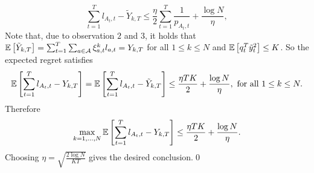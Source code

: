 \documentclass[11pt]{article}
\begin{document}
\begin{equation*}
\sum_{t=1}^Tl_{A_t,t}-\tilde{Y}_{k,T}\leq\frac{\eta}{2}\sum_{t=1}^T\frac{1}{p_{A_t,t}}+\frac{\log N}{\eta},
\end{equation*}
Note that, due to observation $2$ and $3$, it holds that $\mathbb{E}\left[ \tilde{Y}_{k,T} \right]=\sum_{t=1}^T\sum_{a\in \mathcal{A}}\xi_{a,t}^kl_{a,t}=Y_{k,T}$ for all $1\leq k\leq N$ and $\mathbb{E}\left[ q_t^T\tilde{y}_t^2 \right]\leq K$. So the expected regret satisfies
\begin{equation*}
\mathbb{E}\left[ \sum_{t=1}^Tl_{A_t,t}-Y_{k,T} \right]=\mathbb{E}\left[ \sum_{t=1}^Tl_{A_t,t}-\tilde{Y}_{k,T} \right]\leq \frac{\eta TK}{2}+\frac{\log N}{\eta},\text{ for all }1\leq k\leq N.
\end{equation*}
Therefore
\begin{equation*}
\max_{k=1,\ldots,N}\mathbb{E}\left[ \sum_{t=1}^Tl_{A_t,t}-Y_{k,T} \right]\leq \frac{\eta TK}{2}+\frac{\log N}{\eta}.
\end{equation*}
Choosing $\eta=\sqrt{\frac{2\log N}{KT}}$ gives the desired conclusion.\qed











\end{document}
